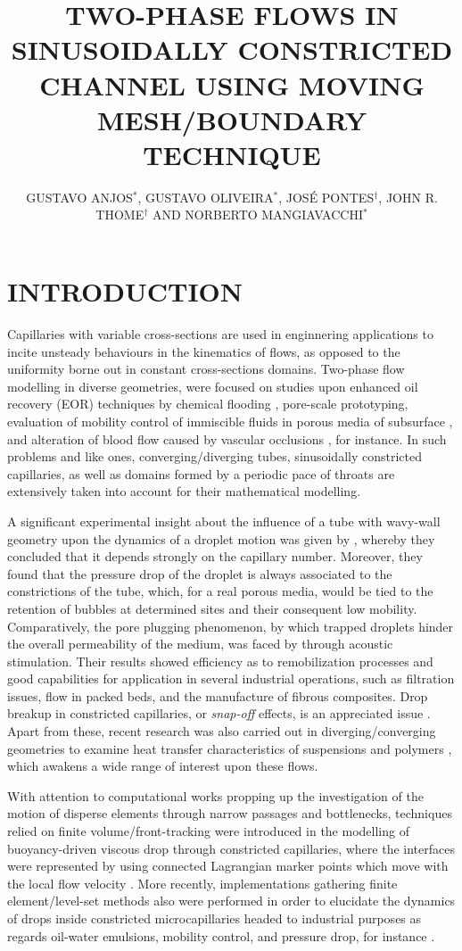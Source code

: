 \documentclass{wccm2014}
\title{TWO-PHASE FLOWS IN SINUSOIDALLY CONSTRICTED CHANNEL USING MOVING
MESH/BOUNDARY TECHNIQUE}
\author{GUSTAVO ANJOS$^{*}$, GUSTAVO OLIVEIRA$^{*}$, JOS\'E
PONTES$^{\dag}$, JOHN R. THOME$^{\dag}$ AND NORBERTO MANGIAVACCHI$^{*}$}
\begin{document}

\section{INTRODUCTION}
\label{sec:intro}

Capillaries with variable cross-sections are used in enginnering
applications to incite unsteady behaviours in the kinematics of flows,
as opposed to the uniformity borne out in constant cross-sections
domains. Two-phase flow modelling in diverse geometries, were focused on 
studies upon enhanced oil recovery (EOR) techniques by chemical 
flooding \cite{olbricht1996,cobos2009}, pore-scale prototyping, 
evaluation of mobility control of immiscible fluids in porous media of 
subsurface \cite{hemmat1996}, and alteration of blood flow caused by 
vascular occlusions \cite{forrester1970}, for instance. In such problems
and like ones, converging/diverging tubes, sinusoidally constricted capillaries, as well as 
domains formed by a periodic pace of throats are extensively taken into account 
for their mathematical modelling.

A significant experimental insight about the influence of a tube with
wavy-wall geometry upon the dynamics of a droplet motion was given by
\cite{olbricht1983}, whereby they concluded that it depends strongly on
the capillary number. Moreover, they found that the pressure drop of the
droplet is always associated to the constrictions of the tube, which,
for a real porous media, would be tied to the retention of bubbles at
determined sites and their consequent low mobility. Comparatively, the
pore plugging phenomenon, by which trapped droplets hinder the overall
permeability of the medium, was faced by \cite{graham2000} through
acoustic stimulation. Their results showed efficiency as to
remobilization processes and good capabilities for application in
several industrial operations, such as filtration issues, flow in packed
beds, and the manufacture of fibrous composites. Drop breakup in
constricted capillaries, or \emph{snap-off} effects, is an appreciated
issue \cite{tsai1994}. Apart from these, recent research was also
carried out in diverging/converging geometries to examine heat transfer
characteristics of suspensions and polymers \cite{narayanam2014}, which
awakens a wide range of interest upon these flows.

With attention to computational works propping up the investigation of
the motion of disperse elements through narrow passages and bottlenecks,
techniques relied on finite volume/front-tracking were introduced in the
modelling of buoyancy-driven viscous drop through constricted
capillaries, where the interfaces were represented by using connected
Lagrangian marker points which move with the local flow velocity
\cite{muradoglu2006,olgac2006}. More
recently, implementations gathering finite element/level-set methods
also were performed in order to elucidate the dynamics of drops inside
constricted microcapillaries headed to industrial purposes as regards
oil-water emulsions, mobility control, and pressure drop, for instance
\cite{roca2013}. 
\end{document}
